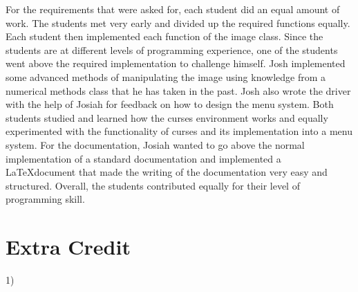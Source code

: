 \documentclass[pdftex, 11pt]{article}
\begin{document}
For the requirements that were asked for, each student did an equal amount of work. The students met very early and
divided up the required functions equally. Each student then implemented each function of the image class. Since the
students are at different levels of programming experience, one of the students went above the required implementation
to challenge himself. Josh implemented some advanced methods of manipulating the image using knowledge from a numerical
methods class that he has taken in the past. Josh also wrote the driver with the help of Josiah for feedback on how to
design the menu system. Both students studied and learned how the curses environment works and equally experimented with
the functionality of curses and its implementation into a menu system. For the documentation, Josiah wanted to go above
the normal implementation of a standard documentation and implemented a \LaTeX document that made the writing of the
documentation very easy and structured. Overall, the students contributed equally for their level of programming skill.

\section{Extra Credit}

1)
\end{document}
